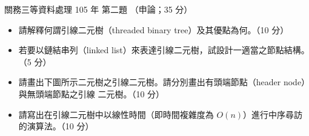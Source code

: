 \begin{pastexam}[label={px:gw3-105-ds-02}]{關務三等資料處理 105 年 第二題}
（申論；35 分）

\begin{itemize}[leftmargin=2em, labelsep=0.3em, itemsep=2pt]
\item[㈠] 請解釋何謂引線二元樹（threaded binary tree）及其優點為何。（10 分）
\item[㈡] 若要以鏈結串列（linked list）來表達引線二元樹，試設計一適當之節點結構。（5 分）
\item[㈢] 請畫出下圖所示二元樹之引線二元樹。請分別畫出有頭端節點（header node）與無頭端節點之引線
二元樹。（10 分）
\begin{center}
\end{center}
\item[㈣] 請寫出在引線二元樹中以線性時間（即時間複雜度為 $O(n)$）進行中序尋訪的演算法。（10 分）
\end{itemize}
\end{pastexam}

